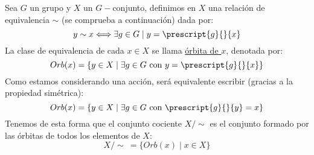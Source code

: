 \begin{definicion}[Órbita]
    Sea $G$ un grupo y $X$ un $G-$conjunto, definimos en $X$ una relación de equivalencia $\sim$ (se comprueba a continuación) dada por:
    \begin{equation*}
        y\sim x \Longleftrightarrow \exists g\in G \mid y = \prescript{g}{}{x}
    \end{equation*}
    La clase de equivalencia de cada $x\in X$ se llama \underline{órbita de $x$}, denotada por:
    \begin{equation*}
        Orb(x) = \{y\in X \mid \exists g\in G \text{\ con\ } y=\prescript{g}{}{x}\}
    \end{equation*}
    Como estamos considerando una acción, será equivalente escribir (gracias a la propiedad simétrica):
    \begin{equation*}
        Orb(x) = \{y\in X\mid \exists g\in G \text{\ con\ } \prescript{g}{}{y} = x\}
    \end{equation*}
    Tenemos de esta forma que el conjunto cociente $X/\sim$ es el conjunto formado por las órbitas de todos los elementos de $X$:
    \begin{equation*}
        X/\sim\ = \{Orb(x) \mid x\in X\}
    \end{equation*}
\end{definicion}
